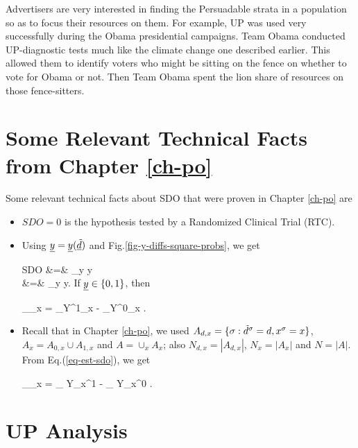 Advertisers are very interested in finding
the Persuadable strata in a population
so as to focus their resources on them.
For example, UP was used very
successfully during the 
Obama presidential campaigns. 
Team Obama conducted UP-diagnostic
tests much like
the climate change one described earlier.
This allowed them to
identify voters who might be sitting on the fence
on whether to vote for Obama or not.
Then Team Obama spent
the lion share
of  resources  on those
fence-sitters.


\section{Some Relevant Technical Facts from Chapter \ref{ch-po}}
Some relevant technical facts
about SDO
that were proven in Chapter \ref{ch-po} are

\begin{itemize}
\item
$SDO=0$ is the hypothesis tested 
by a Randomized Clinical Trial (RTC). 

\item
Using ${\underline{y}}={\underline{y}}({\underline{\tilde{d}}})$
and Fig.\ref{fig-y-diffs-square-probs},
we get

\beqa
SDO &=& \sum_y y
\\
&=&
\sum_y y
\;.
\eeqa
If ${\underline{y}}\in \{0,1\}$, then

\beq
{}_{\displaystyle \delta_x}
=
_{\displaystyle Y^1_x}
-
_{\displaystyle Y^0_x}
\;.
\eeq

\item
Recall that in
Chapter \ref{ch-po}, we used 
$A_{d, x}=\{\sigma:{\tilde{d}}^\sigma=d,x^\sigma=x\}$,
$A_x=A_{0,x}\cup A_{1,x}$ and $A=\cup_x A_x$; also
$N_{d,x}=|A_{d,x}|$, $N_x=|A_x|$ and $N=|A|$.
From
Eq.(\ref{eq-est-sdo}),
we get


\beq
{}_{\displaystyle\delta_x}
=
_
{\displaystyle Y_x^1}
-
_
{\displaystyle Y_x^0}
\;.
\label{eq-est-sdo-uplift}
\eeq

\end{itemize}


\section{UP Analysis}
\label{sec-up-analysis}

